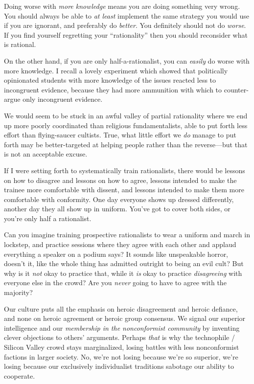 {
 Doing worse with \textit{more knowledge} means you are doing
something very wrong. You should always be able to \textit{at least}
implement the same strategy you would use if you are ignorant, and
preferably do \textit{better}. You definitely should not do
\textit{worse}. If you find yourself regretting your
``rationality'' then you should
reconsider what is rational.}

{
 On the other hand, if you are only half-a-rationalist, you can
\textit{easily} do worse with more knowledge. I recall a lovely
experiment which showed that politically opinionated students with more
knowledge of the issues reacted less to incongruent evidence, because
they had more ammunition with which to counter-argue only incongruent
evidence.}

{
 We would seem to be stuck in an awful valley of partial
rationality where we end up more poorly coordinated than religious
fundamentalists, able to put forth less effort than flying-saucer
cultists. True, what little effort we \textit{do} manage to put forth
may be better-targeted at helping people rather than the reverse---but
that is not an acceptable excuse.}

{
 If I were setting forth to systematically train rationalists,
there would be lessons on how to disagree and lessons on how to agree,
lessons intended to make the trainee more comfortable with dissent, and
lessons intended to make them more comfortable with conformity. One day
everyone shows up dressed differently, another day they all show up in
uniform. You've got to cover both sides, or
you're only half a rationalist.}

{
 Can you imagine training prospective rationalists to wear a
uniform and march in lockstep, and practice sessions where they agree
with each other and applaud everything a speaker on a podium says? It
sounds like unspeakable horror, doesn't it, like the
whole thing has admitted outright to being an evil cult? But why is it
\textit{not} okay to practice that, while it \textit{is} okay to
practice \textit{disagreeing} with everyone else in the crowd? Are you
\textit{never} going to have to agree with the majority?}

{
 Our culture puts all the emphasis on heroic disagreement and
heroic defiance, and none on heroic agreement or heroic group
consensus. We signal our superior intelligence and our
\textit{membership in the nonconformist community} by inventing clever
objections to others' arguments. Perhaps \textit{that}
is why the technophile / Silicon Valley crowd stays marginalized,
losing battles with less nonconformist factions in larger society. No,
we're not losing because we're so
superior, we're losing because our exclusively
individualist traditions sabotage our ability to cooperate.}

